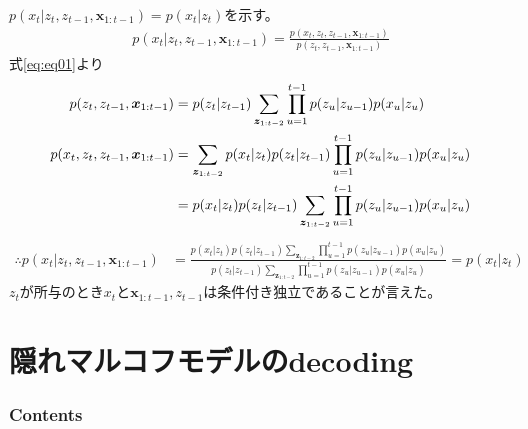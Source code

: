\documentclass[aspectratio=169,unicode,dvipdfmx,14pt]{beamer}
\begin{document}
\begin{frame}{}
\FontMath
$p(x_t|z_t,z_{t-1},\bm{x}_{1:t-1}) = p(x_t|z_t)$を示す。
\begin{align}
p(x_t|z_t,z_{t-1},\bm{x}_{1:t-1})
= \frac{p(x_t,z_t,z_{t-1},\bm{x}_{1:t-1})}{p(z_t,z_{t-1},\bm{x}_{1:t-1})}
\end{align}
\vspace{-.1in}
式\eqref{eq:eq01}より
\begin{align}
p(z_t,z_{t-1},\bm{x}_{1:t-1}) 
& = p(z_t|z_{t-1}) \sum_{\bm{z}_{1:t-2}} \prod_{u=1}^{t-1} p(z_u|z_{u-1})p(x_u|z_u) \notag
\\
p(x_t, z_t,z_{t-1},\bm{x}_{1:t-1}) 
& = \sum_{\bm{z}_{1:t-2}}  p(x_t|z_t) p(z_t|z_{t-1}) \prod_{u=1}^{t-1} p(z_u|z_{u-1})p(x_u|z_u)
\notag \\ & = p(x_t|z_t) p(z_t|z_{t-1}) \sum_{\bm{z}_{1:t-2}} \prod_{u=1}^{t-1} p(z_u|z_{u-1})p(x_u|z_u)
\end{align}
\vspace{-.1in}
\begin{align}
\therefore
p(x_t|z_t,z_{t-1},\bm{x}_{1:t-1})
& = \frac{p(x_t|z_t) p(z_t|z_{t-1}) \sum_{\bm{z}_{1:t-2}} \prod_{u=1}^{t-1} p(z_u|z_{u-1})p(x_u|z_u)
}{p(z_t|z_{t-1}) \sum_{\bm{z}_{1:t-2}} \prod_{u=1}^{t-1} p(z_u|z_{u-1})p(x_u|z_u)
}
=p(x_t|z_t)
\end{align}
$z_t$が所与のとき$x_t$と$\bm{x}_{1:t-1},z_{t-1}$は条件付き独立であることが言えた。
\end{frame}


\section{隠れマルコフモデルのdecoding}

\begin{frame}\frametitle{Contents}
\Large \tableofcontents[currentsection]
\end{frame}
\end{document}
